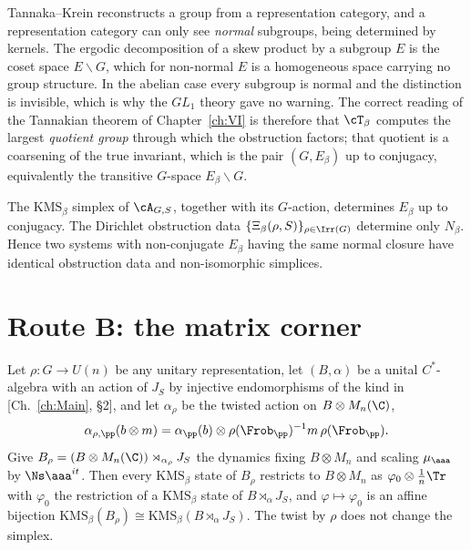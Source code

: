 \begin{remark}\label{VII:rem:why}
Tannaka--Krein reconstructs a group from a representation category, and a representation
category can only see \emph{normal} subgroups, being determined by kernels. The ergodic
decomposition of a skew product by a subgroup $E$ is the coset space $E\backslash G$, which
for non-normal $E$ is a homogeneous space carrying no group structure. In the abelian case
every subgroup is normal and the distinction is invisible, which is why the $GL_1$ theory
gave no warning. The correct reading of the Tannakian theorem of Chapter~\ref{ch:VI} is therefore
that $\cT_\beta$ computes the largest \emph{quotient group} through which the obstruction
factors;
that quotient is a coarsening of the true invariant, which is the pair $(G,E_\beta)$ up to
conjugacy, equivalently the transitive $G$-space $E_\beta\backslash G$.
\end{remark}

\begin{corollary}\label{VII:cor:invariant}
The $\mathrm{KMS}_\beta$ simplex of $\cA_{G,S}$, together with its $G$-action, determines
$E_\beta$ up to conjugacy. The Dirichlet obstruction data
$\{\Xi_\beta(\rho,S)\}_{\rho\in\Irr(G)}$ determine only $N_\beta$. Hence two systems with
non-conjugate $E_\beta$ having the same normal closure have identical obstruction data and
non-isomorphic simplices.
\end{corollary}

\section{Route B: the matrix corner}

\begin{proposition}\label{VII:prop:corner}
Let $\rho:G\to U(n)$ be any unitary representation, let $(B,\alpha)$ be a unital
$C^*$-algebra with an action of $J_S$ by injective endomorphisms of the kind in
[Ch.~\ref{ch:Main}, \S2], and let $\alpha_\rho$ be the twisted action on $B\otimes M_n(\C)$,
\[
\alpha_{\rho,\pp}(b\otimes m)=\alpha_\pp(b)\otimes\rho(\Frob_\pp)^{-1}m\,\rho(\Frob_\pp).
\]
Give $B_\rho=(B\otimes M_n(\C))\rtimes_{\alpha_\rho}J_S$ the dynamics fixing $B\otimes M_n$
and scaling $\mu_\aaa$ by $\Ns\aaa^{it}$. Then every $\mathrm{KMS}_\beta$ state of $B_\rho$
restricts to $B\otimes M_n$ as $\varphi_0\otimes\tfrac1n\Tr$ with $\varphi_0$ the
restriction of a $\mathrm{KMS}_\beta$ state of $B\rtimes_\alpha J_S$, and
$\varphi\mapsto\varphi_0$ is an affine bijection
$\mathrm{KMS}_\beta(B_\rho)\cong\mathrm{KMS}_\beta(B\rtimes_\alpha J_S)$. The twist by
$\rho$ does not change the simplex.
\end{proposition}

